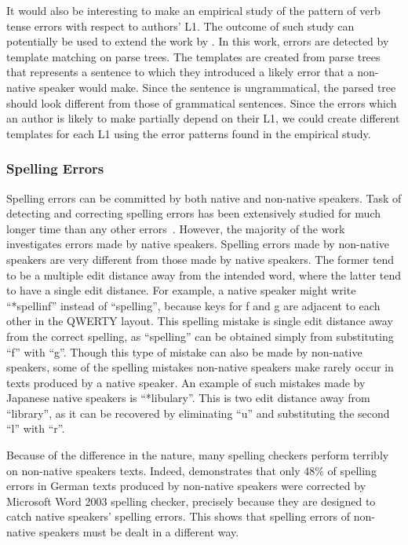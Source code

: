 \documentclass[11pt]{article}
\begin{document}
It would also be interesting to make an empirical study of the pattern of verb tense errors with respect to authors' L1. The outcome of such study can potentially be used to extend the work by \cite{lee2008correcting}. In this work, errors are detected by template matching on parse trees. The templates are created from parse trees that represents a sentence to which they introduced a likely error that a non-native speaker would make. Since the sentence is ungrammatical, the parsed tree should look different from those of grammatical sentences. Since the errors which an author is likely to make partially depend on their L1, we could create different templates for each L1 using the error patterns found in the empirical study.

\subsubsection{Spelling Errors}
Spelling errors can be committed by both native and non-native speakers. Task of detecting and correcting spelling errors has been extensively studied for much longer time than any other errors~\citep{heift2007errors}. However, the majority of the work investigates errors made by native speakers. Spelling errors made by non-native speakers are very different from those made by native speakers. The former tend to be a multiple edit distance away from the intended word, where the latter tend to have a single edit distance. For example, a native speaker might write ``*spellinf'' instead of ``spelling'', because keys for f and g are adjacent to each other in the QWERTY layout. This spelling mistake is single edit distance away from the correct spelling, as ``spelling'' can be obtained simply from substituting ``f'' with ``g''. Though this type of mistake can also be made by non-native speakers, some of the spelling mistakes non-native speakers make rarely occur in texts produced by a native speaker. An example of such mistakes made by Japanese native speakers is ``*libulary''. This is two edit distance away from ``library'', as it can be recovered by eliminating ``u'' and substituting the second ``l'' with ``r''. 

Because of the difference in the nature, many spelling checkers perform terribly on non-native speakers texts. Indeed, \cite{rimrott2005language} demonstrates that only 48\% of spelling errors in German texts produced by non-native speakers were corrected by Microsoft Word 2003 spelling checker, precisely because they are designed to catch native speakers' spelling errors. This shows that spelling errors of non-native speakers must be dealt in a different way. 
\end{document}
